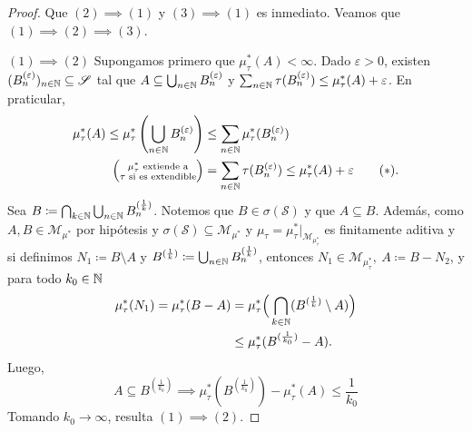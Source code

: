 \begin{proof}
	Que $(2) \implies (1)$ y $(3) \implies (1)$ es inmediato. Veamos que $(1) \implies (2) \implies (3)$. \par
	\medskip
	$\boxed{(1) \implies (2)}$ Supongamos primero que $\mu^{*}_{\tau}(A) < \infty$. Dado $\varepsilon > 0$, existen $(B^{(\varepsilon{})}_{n})_{n\in\mathbb{N}} \subseteq \mathscr{S}$ tal que $A \subseteq \bigcup_{n\in\mathbb{N}} B^{(\varepsilon{})}_{n}$ y $\sum_{n\in\mathbb{N}}\tau(B^{(\varepsilon)}_{n}) \leq \mu^{*}_{\tau}(A) + \varepsilon{}$. En praticular,
	\begin{align*}
		\mu^{*}_{\tau}(A) \leq \mu^{*}_{\tau}\left( \bigcup_{n\in\mathbb{N}} B^{(\varepsilon)}_{n} \right) & \leq \sum_{n\in\mathbb{N}} \mu^{*}_{\tau}(B^{(\varepsilon)}_{n}) \\
		\Big( \substack{\mu^{*}_{\tau} \text{ extiende a} \\
			\tau \text{ si es extendible}} \Big) &= \sum_{n\in\mathbb{N}} \tau(B^{(\varepsilon{})}_{n}) \leq \mu^{*}_{\tau}(A) + \varepsilon{} \tag{$*$}
	.\end{align*}
	Sea $B \coloneq \bigcap_{k\in\mathbb{N}} \bigcup_{n\in\mathbb{N}} B^{(\frac{1}{k})}_{n}$. Notemos que $B \in \sigma(\mathscr{S})$ y que $A \subseteq B$. Además, como $A,B \in \mathscr{M}_{\mu^{*}}$ por hipótesis y $\sigma(\mathscr{S}) \subseteq \mathscr{M}_{\mu^{*}}$ y $\mu_{\tau} = \mu^{*}_{\tau}\big|_{\mathscr{M}_{\mu^{*}_{\tau}}}$ es finitamente aditiva y si definimos $N_{1} \coloneq B \setminus A$ y $B^{(\frac{1}{k})} \coloneq \bigcup_{n\in\mathbb{N}}B^{(\frac{1}{k})}_{n}$, entonces $N_{1} \in \mathscr{M}_{\mu^{*}_{\tau}},\ A \coloneq B - N_{2}$, y para todo $k_{0} \in \mathbb{N}$
	\begin{align*}
		\mu^{*}_{\tau}(N_{1}) = \mu^{*}_{\tau}(B - A) &= \mu^{*}_{\tau} \Big( \bigcap_{k\in\mathbb{N}} (B^{(\frac{1}{k})} \setminus A) \Big) \\
		& \leq \mu^{*}_{\tau}(B^{(\frac{1}{k_{0}})}-A)
	.\end{align*}
	Luego,
	\[ A \subseteq B^{(\frac{1}{k_{0}})} \implies \mu^{*}_{\tau}(B^{(\frac{1}{k_{0}})}) - \mu^{*}_{\tau}(A) \leq \frac{1}{k_{0}} \tag{$*$} \]
	Tomando $k_{0} \longrightarrow{} \infty$, resulta $(1) \implies (2)$.
\end{proof}
